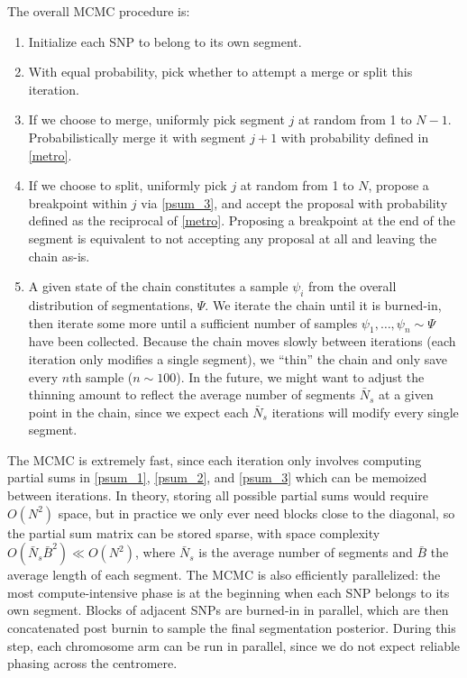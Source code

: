\documentclass[10pt,letter]{article}
\numberwithin{equation}{section}
\begin{document}
The overall MCMC procedure is:
\begin{enumerate}
\item Initialize each SNP to belong to its own segment.
\item With equal probability, pick whether to attempt a merge or split this iteration.
\item If we choose to merge, uniformly pick segment $j$ at random from 1 to $N-1$. Probabilistically merge it with segment $j+1$ with probability defined in \eqref{metro}.
\item If we choose to split, uniformly pick $j$ at random from 1 to $N$, propose a breakpoint within $j$ via \eqref{psum_3}, and accept the proposal with probability defined as the reciprocal of \eqref{metro}. Proposing a breakpoint at the end of the segment is equivalent to not accepting any proposal at all and leaving the chain as-is.
\item A given state of the chain constitutes a sample $\psi_i$ from the overall distribution of segmentations, $\Psi$. We iterate the chain until it is burned-in, then iterate some more until a sufficient number of samples $\psi_1,\dots,\psi_n\sim\Psi$ have been collected. Because the chain moves slowly between iterations (each iteration only modifies a single segment), we ``thin'' the chain and only save every $n$th sample ($n\sim 100$). In the future, we might want to adjust the thinning amount to reflect the average number of segments $\bar{N}_s$ at a given point in the chain, since we expect each $\bar{N}_s$ iterations will modify every single segment.
\end{enumerate}

The MCMC is extremely fast, since each iteration only involves computing partial sums in \eqref{psum_1}, \eqref{psum_2}, and \eqref{psum_3} which can be memoized between iterations. In theory, storing all possible partial sums would require $O(N^2)$ space, but in practice we only ever need blocks close to the diagonal, so the partial sum matrix can be stored sparse, with space complexity $O(\bar{N}_s\bar{B}^2)\ll O(N^2)$, where $\bar{N}_s$ is the average number of segments and $\bar{B}$ the average length of each segment. The MCMC is also efficiently parallelized: the most compute-intensive phase is at the beginning when each SNP belongs to its own segment. Blocks of adjacent SNPs are burned-in in parallel, which are then concatenated post burnin to sample the final segmentation posterior. During this step, each chromosome arm can be run in parallel, since we do not expect reliable phasing across the centromere.
\end{document}
